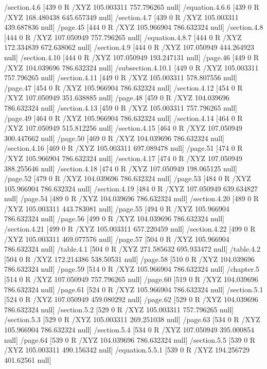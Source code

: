 {{{{{{{/section.4.6 [439 0 R /XYZ 105.003311 757.796265 null]
/equation.4.6.6 [439 0 R /XYZ 168.480438 645.657349 null]
/section.4.7 [439 0 R /XYZ 105.003311 439.687836 null]
/page.45 [444 0 R /XYZ 105.966904 786.632324 null]
/section.4.8 [444 0 R /XYZ 107.050949 757.796265 null]
/equation.4.8.7 [444 0 R /XYZ 172.334839 672.638062 null]
/section.4.9 [444 0 R /XYZ 107.050949 444.264923 null]
/section.4.10 [444 0 R /XYZ 107.050949 193.247131 null]
/page.46 [449 0 R /XYZ 104.039696 786.632324 null]
/subsection.4.10.1 [449 0 R /XYZ 105.003311 757.796265 null]
/section.4.11 [449 0 R /XYZ 105.003311 578.807556 null]
/page.47 [454 0 R /XYZ 105.966904 786.632324 null]
/section.4.12 [454 0 R /XYZ 107.050949 351.638885 null]
/page.48 [459 0 R /XYZ 104.039696 786.632324 null]
/section.4.13 [459 0 R /XYZ 105.003311 757.796265 null]
/page.49 [464 0 R /XYZ 105.966904 786.632324 null]
/section.4.14 [464 0 R /XYZ 107.050949 515.812256 null]
/section.4.15 [464 0 R /XYZ 107.050949 300.447662 null]
/page.50 [469 0 R /XYZ 104.039696 786.632324 null]
/section.4.16 [469 0 R /XYZ 105.003311 697.089478 null]
/page.51 [474 0 R /XYZ 105.966904 786.632324 null]
/section.4.17 [474 0 R /XYZ 107.050949 388.255646 null]
/section.4.18 [474 0 R /XYZ 107.050949 198.065125 null]
/page.52 [479 0 R /XYZ 104.039696 786.632324 null]
/page.53 [484 0 R /XYZ 105.966904 786.632324 null]
/section.4.19 [484 0 R /XYZ 107.050949 639.634827 null]
/page.54 [489 0 R /XYZ 104.039696 786.632324 null]
/section.4.20 [489 0 R /XYZ 105.003311 443.783081 null]
/page.55 [494 0 R /XYZ 105.966904 786.632324 null]
/page.56 [499 0 R /XYZ 104.039696 786.632324 null]
/section.4.21 [499 0 R /XYZ 105.003311 657.220459 null]
/section.4.22 [499 0 R /XYZ 105.003311 469.077576 null]
/page.57 [504 0 R /XYZ 105.966904 786.632324 null]
/table.4.1 [504 0 R /XYZ 271.585632 695.933472 null]
/table.4.2 [504 0 R /XYZ 172.214386 538.50531 null]
/page.58 [510 0 R /XYZ 104.039696 786.632324 null]
/page.59 [514 0 R /XYZ 105.966904 786.632324 null]
/chapter.5 [514 0 R /XYZ 107.050949 757.796265 null]
/page.60 [519 0 R /XYZ 104.039696 786.632324 null]
/page.61 [524 0 R /XYZ 105.966904 786.632324 null]
/section.5.1 [524 0 R /XYZ 107.050949 459.080292 null]
/page.62 [529 0 R /XYZ 104.039696 786.632324 null]
/section.5.2 [529 0 R /XYZ 105.003311 757.796265 null]
/section.5.3 [529 0 R /XYZ 105.003311 269.251038 null]
/page.63 [534 0 R /XYZ 105.966904 786.632324 null]
/section.5.4 [534 0 R /XYZ 107.050949 395.000854 null]
/page.64 [539 0 R /XYZ 104.039696 786.632324 null]
/section.5.5 [539 0 R /XYZ 105.003311 490.156342 null]
/equation.5.5.1 [539 0 R /XYZ 194.256729 401.62561 null]
}}}}}}}
